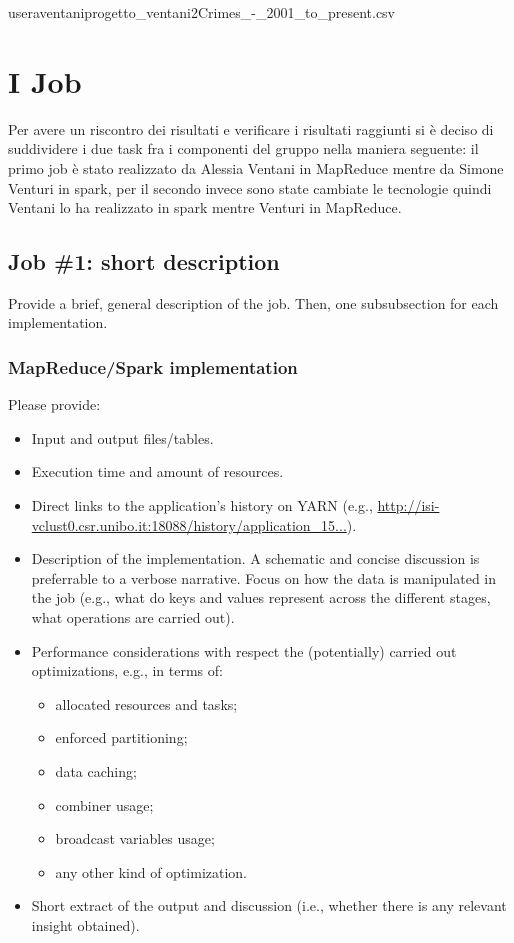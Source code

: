 \documentclass[10pt]{article}
\begin{document}
user\/aventani\/progetto_ventani\/2\/Crimes_-_2001_to_present.csv 

\section{I Job}

Per avere un riscontro dei risultati e verificare i risultati raggiunti si è deciso di suddividere i due task fra i componenti del gruppo nella maniera seguente: il primo job è stato realizzato da Alessia Ventani in MapReduce mentre da Simone Venturi in spark, per il secondo invece sono state cambiate le tecnologie quindi Ventani lo ha realizzato in spark mentre Venturi in MapReduce.


\subsection{Job \#1: short description}

Provide a brief, general description of the job. Then, one subsubsection for each implementation.

\subsubsection{MapReduce/Spark implementation}

Please provide:
\begin{itemize}
\item Input and output files/tables.
\item Execution time and amount of resources.
\item Direct links to the application's history on YARN (e.g., \url{http://isi-vclust0.csr.unibo.it:18088/history/application_15...}).
\item Description of the implementation. A schematic and concise discussion is preferrable to a verbose narrative. Focus on how the data is manipulated in the job (e.g., what do keys and values represent across the different stages, what operations are carried out). 
\item Performance considerations with respect the (potentially) carried out optimizations, e.g., in terms of:
\begin{itemize}
\item allocated resources and tasks;
\item enforced partitioning;
\item data caching;
\item combiner usage;
\item broadcast variables usage;
\item any other kind of optimization.
\end{itemize}
\item Short extract of the output and discussion (i.e., whether there is any relevant insight obtained).
\end{itemize}
\end{document}
